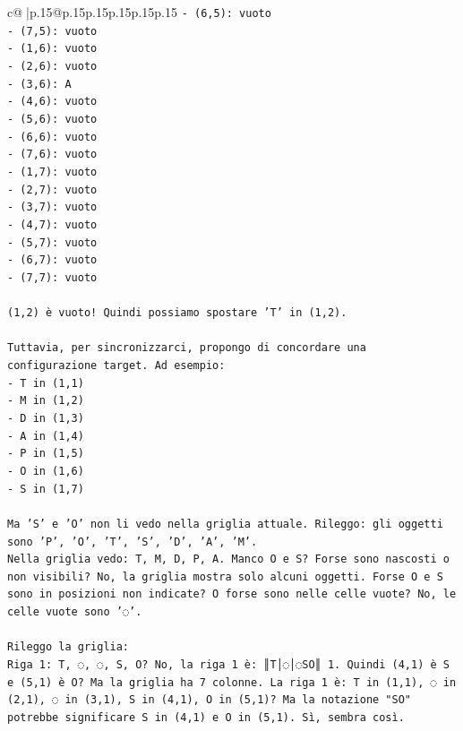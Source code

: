 \documentclass{article}
\begin{document}
{\begin{supertabular}{c@{$\;$}|p{.15\linewidth}@{}p{.15\linewidth}p{.15\linewidth}p{.15\linewidth}p{.15\linewidth}p{.15\linewidth}}
{{{\texttt{{-} (6,5): vuoto} \\
\texttt{{-} (7,5): vuoto} \\
\texttt{{-} (1,6): vuoto} \\
\texttt{{-} (2,6): vuoto} \\
\texttt{{-} (3,6): A} \\
\texttt{{-} (4,6): vuoto} \\
\texttt{{-} (5,6): vuoto} \\
\texttt{{-} (6,6): vuoto} \\
\texttt{{-} (7,6): vuoto} \\
\texttt{{-} (1,7): vuoto} \\
\texttt{{-} (2,7): vuoto} \\
\texttt{{-} (3,7): vuoto} \\
\texttt{{-} (4,7): vuoto} \\
\texttt{{-} (5,7): vuoto} \\
\texttt{{-} (6,7): vuoto} \\
\texttt{{-} (7,7): vuoto} \\
\\ 
\texttt{(1,2) è vuoto! Quindi possiamo spostare 'T' in (1,2).} \\
\\ 
\texttt{Tuttavia, per sincronizzarci, propongo di concordare una configurazione target. Ad esempio:} \\
\texttt{{-} T in (1,1)} \\
\texttt{{-} M in (1,2)} \\
\texttt{{-} D in (1,3)} \\
\texttt{{-} A in (1,4)} \\
\texttt{{-} P in (1,5)} \\
\texttt{{-} O in (1,6)} \\
\texttt{{-} S in (1,7)} \\
\\ 
\texttt{Ma 'S' e 'O' non li vedo nella griglia attuale. Rileggo: gli oggetti sono 'P', 'O', 'T', 'S', 'D', 'A', 'M'.} \\
\texttt{Nella griglia vedo: T, M, D, P, A. Manco O e S? Forse sono nascosti o non visibili? No, la griglia mostra solo alcuni oggetti. Forse O e S sono in posizioni non indicate? O forse sono nelle celle vuote? No, le celle vuote sono '◌'.} \\
\\ 
\texttt{Rileggo la griglia:} \\
\texttt{Riga 1: T, ◌, ◌, S, O? No, la riga 1 è: ║T│◌│◌SO║ 1. Quindi (4,1) è S e (5,1) è O? Ma la griglia ha 7 colonne. La riga 1 è: T in (1,1), ◌ in (2,1), ◌ in (3,1), S in (4,1), O in (5,1)? Ma la notazione "SO" potrebbe significare S in (4,1) e O in (5,1). Sì, sembra così.} \\
}}}
\end{supertabular}}
\end{document}
